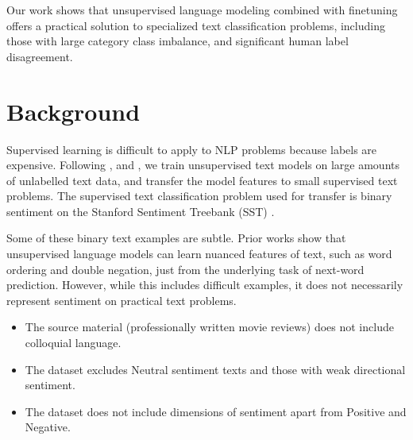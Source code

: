\documentclass[letterpaper]{article} %
\begin{document}
Our work shows that unsupervised language modeling combined with finetuning offers a practical solution to specialized text classification problems, including those with large category class imbalance, and significant human label disagreement. 



\section{Background}
Supervised learning is difficult to apply to NLP problems because labels are expensive. Following \protect\cite{Radford2017}, \protect\cite{Radford2018} and \protect\cite{Dai2015}, we train unsupervised text models on large amounts of unlabelled text data, and transfer the model features to small supervised text problems. The supervised text classification problem used for transfer is binary sentiment on the Stanford Sentiment Treebank (SST) \protect\cite{SST-Socher:2013}.


Some of these binary text examples are subtle. Prior works show that unsupervised language models can learn nuanced features of text, such as word ordering and double negation, just from the underlying task of next-word prediction. However, while this includes difficult examples, it does not necessarily represent sentiment on practical text problems.
\begin{itemize}
\itemsep0em
    \item The source material (professionally written movie reviews) does not include colloquial language.
    \item The dataset excludes Neutral sentiment texts and those with weak directional sentiment.
    \item The dataset does not include dimensions of sentiment apart from Positive and Negative.
\end{itemize}
\end{document}
